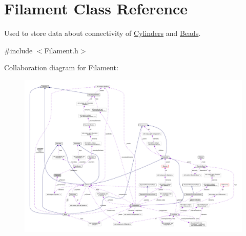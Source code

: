 \hypertarget{classFilament}{\section{Filament Class Reference}
\label{classFilament}
}


Used to store data about connectivity of \hyperlink{classCylinder}{Cylinders} and \hyperlink{classBead}{Beads}.  




{\ttfamily \#include $<$Filament.\+h$>$}



Collaboration diagram for Filament\+:
\nopagebreak
\begin{figure}[H]
\begin{center}
\leavevmode
\includegraphics[width=350pt]{classFilament__coll__graph}
\end{center}
\end{figure}
